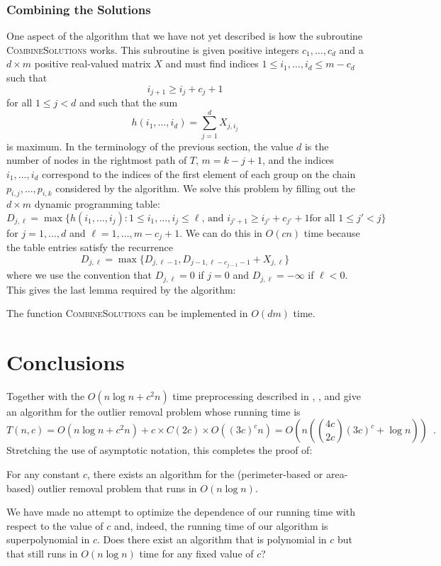 \documentclass[lotsofwhite]{patmorin}
\newcommand{\runtime}{n\left({4c\choose 2c}(3c)^c + \log n\right)}
\newcommand{\Oruntime}{O\left(\runtime\right)}
\begin{document}
\subsubsection{Combining the Solutions}

One aspect of the algorithm that we have not yet described is how the
subroutine \textsc{CombineSolutions} works.  This subroutine is given
positive integers $c_1,\ldots,c_d$ and a $d\times m$ positive
real-valued matrix $X$ and must find 
indices $1\le i_1,\ldots,i_d \le m-c_d$ such that
\[
     i_{j+1} \ge i_j + c_j + 1
\]
for all $1\le j < d$ and such that the sum
\[
      h(i_1,\ldots,i_d)=\sum_{j=1}^d X_{j,i_j}
\]
is maximum.  In the terminology of the previous section, the value $d$
is the number of nodes in the rightmost path of $T$, $m=k-j+1$, and
the indices
$i_1,\ldots,i_d$ correspond to the indices of the
first element of each group on the chain $p_{i,j},\ldots,p_{i,k}$
considered by the algorithm.
We solve this problem by filling out the $d\times m$ dynamic
programming table:
\[
     D_{j,\ell} = \max\{h(i_1,\ldots,i_j):
      \mbox{$1\le i_1,\ldots,i_j\le \ell$, and $i_{j'+1} \ge i_{j'}+c_{j'}+1$
             for all $1\le j'< j$}  \} 
\]
for $j=1,\ldots,d$ and $\ell=1,\ldots,m-c_j+1$.  We can do this in
$O(cn)$ time because the table entries satisfy the recurrence
\[
     D_{j,\ell} = \max\{D_{j,\ell-1},D_{j-1,\ell-c_{j-1}-1}+X_{j,\ell} \}
\]
where we use the convention that $D_{j,\ell} = 0$ if $j=0$ and
$D_{j,\ell}=-\infty$ if $\ell<0$.  This gives the last lemma required
by the algorithm:

\begin{lem}
The function \textsc{CombineSolutions} can be implemented in
$O(dm)$ time.
\end{lem}

\section{Conclusions}

Together with the $O(n\log n+c^2n)$ time preprocessing described in
, ,  and
 give an algorithm for the outlier removal problem
whose running time is
\[
 T(n,c) =   O(n\log n + c^2 n) + c \times C(2c) \times O((3c)^cn) 
      = \Oruntime \enspace .
\]
Stretching the use of asymptotic notation, this completes the proof of:
\begin{thm}
For any constant $c$, there exists an algorithm for the
(perimeter-based or area-based) outlier removal problem that runs in
$O(n\log n)$.
\end{thm}

We have made no attempt to optimize the dependence of our running time
with respect to the value of $c$ and, indeed, the running time of our
algorithm is superpolynomial in $c$. Does there exist an algorithm
that is polynomial in $c$ but that still runs in $O(n\log n)$ time for
any fixed value of $c$?



\end{document}
